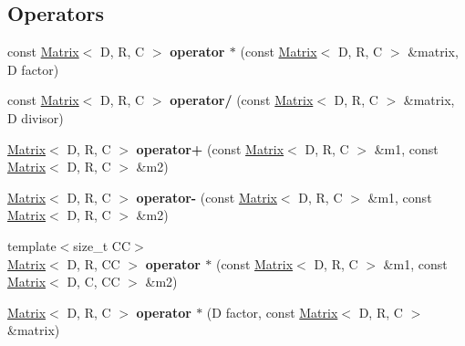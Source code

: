 \subsection*{Operators}
\begin{DoxyCompactItemize}
\item 
\mbox{\label{classrev_1_1_matrix_a2b79057d2ed8e7c3de774cde98717c28}} 
const \mbox{\hyperlink{classrev_1_1_matrix}{Matrix}}$<$ D, R, C $>$ {\bfseries operator $\ast$} (const \mbox{\hyperlink{classrev_1_1_matrix}{Matrix}}$<$ D, R, C $>$ \&matrix, D factor)
\item 
\mbox{\label{classrev_1_1_matrix_a48d7bc1a38c2e64457467619613d9982}} 
const \mbox{\hyperlink{classrev_1_1_matrix}{Matrix}}$<$ D, R, C $>$ {\bfseries operator/} (const \mbox{\hyperlink{classrev_1_1_matrix}{Matrix}}$<$ D, R, C $>$ \&matrix, D divisor)
\item 
\mbox{\label{classrev_1_1_matrix_ae155ccfe9d112451dfeeedbb02082a67}} 
\mbox{\hyperlink{classrev_1_1_matrix}{Matrix}}$<$ D, R, C $>$ {\bfseries operator+} (const \mbox{\hyperlink{classrev_1_1_matrix}{Matrix}}$<$ D, R, C $>$ \&m1, const \mbox{\hyperlink{classrev_1_1_matrix}{Matrix}}$<$ D, R, C $>$ \&m2)
\item 
\mbox{\label{classrev_1_1_matrix_af29e5c618452bcd0c1cf703459ab6bc4}} 
\mbox{\hyperlink{classrev_1_1_matrix}{Matrix}}$<$ D, R, C $>$ {\bfseries operator-\/} (const \mbox{\hyperlink{classrev_1_1_matrix}{Matrix}}$<$ D, R, C $>$ \&m1, const \mbox{\hyperlink{classrev_1_1_matrix}{Matrix}}$<$ D, R, C $>$ \&m2)
\item 
\mbox{\label{classrev_1_1_matrix_a20346d9b251ec3b546e4b7bca02e1bb5}} 
{\footnotesize template$<$size\+\_\+t CC$>$ }\\\mbox{\hyperlink{classrev_1_1_matrix}{Matrix}}$<$ D, R, CC $>$ {\bfseries operator $\ast$} (const \mbox{\hyperlink{classrev_1_1_matrix}{Matrix}}$<$ D, R, C $>$ \&m1, const \mbox{\hyperlink{classrev_1_1_matrix}{Matrix}}$<$ D, C, CC $>$ \&m2)
\item 
\mbox{\label{classrev_1_1_matrix_a19b0def09d44e81421a4ec172575c272}} 
\mbox{\hyperlink{classrev_1_1_matrix}{Matrix}}$<$ D, R, C $>$ {\bfseries operator $\ast$} (D factor, const \mbox{\hyperlink{classrev_1_1_matrix}{Matrix}}$<$ D, R, C $>$ \&matrix)

\end{DoxyCompactItemize}
